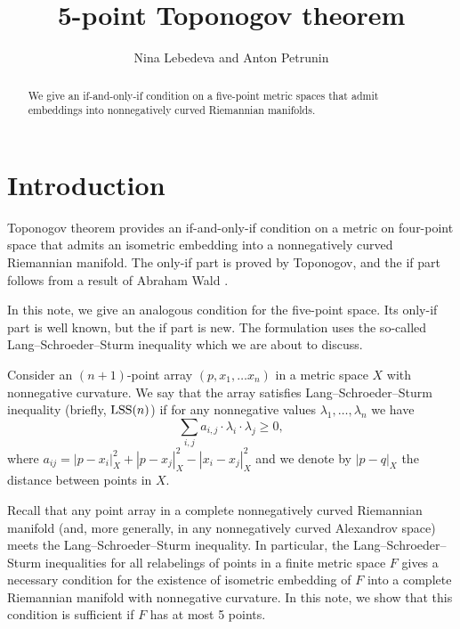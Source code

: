\documentclass{article}
\begin{document}


\title{5-point Toponogov theorem}
\author{Nina Lebedeva and Anton Petrunin}

\date{}
\maketitle
\begin{abstract}
We give an if-and-only-if condition on a five-point metric spaces that admit embeddings into nonnegatively curved Riemannian manifolds.
\end{abstract}


\section{Introduction}

Toponogov theorem provides an if-and-only-if condition on a metric on four-point space that admits an isometric embedding into a nonnegatively curved Riemannian manifold.
The only-if part is proved by Toponogov, and the if part follows from a result of Abraham Wald \cite[\S 7]{wald}.

In this note, we give an analogous condition for the five-point space.
Its only-if part is well known, but the if part is new.
The formulation uses the so-called Lang--Schroeder--Sturm inequality \cite{lang-schroeder, sturm} which we are about to discuss.

Consider an $(n+1)$-point array $(p,x_1,\dots x_n)$ in a metric space $X$ with nonnegative curvature.
We say that the array satisfies Lang--Schroeder--Sturm inequality (briefly,  $\mathrm{LSS}(n)$)
if for any nonnegative values $\lambda_1,\dots,\lambda_n$ we have
\[\sum_{i,j}a_{i,j}\cdot \lambda_i\cdot\lambda_j\ge 0,\]
where $a_{ij}=|p-x_i|_X^2+|p-x_j|_X^2-|x_i-x_j|_X^2$
and we denote by $|p-q|_X$ the distance between points in $X$.

Recall that any point array in a  complete nonnegatively curved Riemannian manifold (and, more generally, in any nonnegatively curved Alexandrov space) meets the Lang--Schroeder--Sturm inequality.
In particular, 
the Lang--Schroeder--Sturm inequalities for all relabelings of points in a finite metric space $F$
gives a necessary condition for the existence of isometric embedding of $F$ into a complete Riemannian manifold with nonnegative curvature.
In this note, we show that this condition is sufficient if $F$ has at most 5 points.
\end{document}
